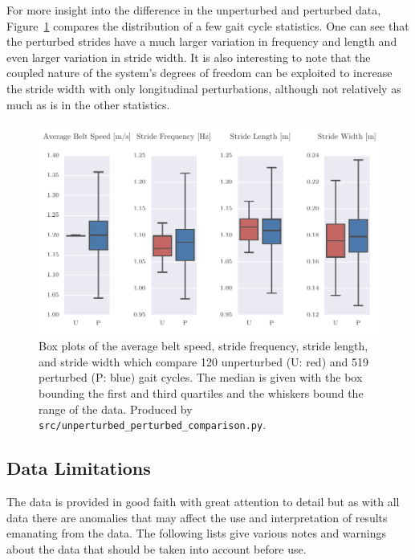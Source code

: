 \documentclass[fleqn,12pt]{wlpeerj}
\begin{document}
For more insight into the difference in the unperturbed and perturbed data,
Figure~\ref{fig:gait-cycle-stats-comparison} compares the distribution of a few
gait cycle statistics. One can see that the perturbed strides have a much
larger variation in frequency and length and even larger variation in stride
width. It is also interesting to note that the coupled nature of the system's
degrees of freedom can be exploited to increase the stride width with only
longitudinal perturbations, although not relatively as much as is in the other
statistics.
%
\begin{figure}
  \centering
  \includegraphics{figures/unperturbed-perturbed-boxplot-comparison.pdf}
  \cprotect\caption{Box plots of the average belt speed, stride frequency,
    stride length, and stride width which compare 120 unperturbed (U: red) and
    519 perturbed (P: blue) gait cycles. The median is given with the box
    bounding the first and third quartiles and the whiskers bound the range of
    the data. Produced by \verb|src/unperturbed_perturbed_comparison.py|.}
  \label{fig:gait-cycle-stats-comparison}
\end{figure}

\subsection*{Data Limitations}
%
The data is provided in good faith with great attention to detail but as with
all data there are anomalies that may affect the use and interpretation of
results emanating from the data. The following lists give various notes and
warnings about the data that should be taken into account before use.
\end{document}
